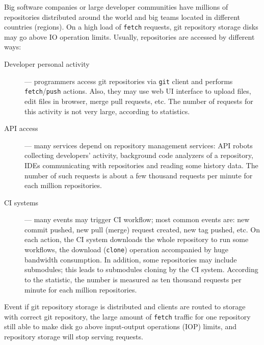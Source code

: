 \documentclass[acmlarge, screen, nonacm, 11pt]{acmart}
\newcommand{\code}[1]{\texttt{#1}}
\begin{document}
Big software companies or large developer communities have
millions of repositories distributed around the world and big teams located in different countries
(regions). On a high load of \code{fetch} requests, git repository storage disks may go above IO operation limits.
Usually, repositories are accessed by different ways:
\begin{description}
  \item[Developer personal activity] --- programmers access git repositories via
    \code{git} client and performs \code{fetch}/\code{push} actions. Also, they
    may use web UI interface to upload files, edit files in browser, merge pull requests, etc.
    The number of requests for this activity is not very large, according to statistics.
  \item[API access] --- many services depend on repository management services: API robots
    collecting developers' activity, background code analyzers of a repository, IDEs communicating
    with repositories and reading some history data. The number of such requests is about
    a few thousand requests per minute for each million repositories.
  \item[CI systems] --- many events may trigger CI workflow; most common events are:
    new commit pushed, new pull (merge) request created, new tag pushed, etc.
    On each action, the CI system downloads the whole repository to run some workflows,
    the download (\code{clone}) operation accompanied by huge bandwidth consumption.
    In addition, some repositories may include submodules; this leads to submodules cloning by the CI
    system. According to the statistic, the number is measured as ten thousand requests per minute
    for each million repositories.
\end{description}

Event if git repository storage is distributed and clients are routed to storage with
correct git repository, the large amount of \code{fetch} traffic for one repository still able to
make disk go above input-output operations (IOP) limits, and repository storage will stop
serving requests.
\end{document}
